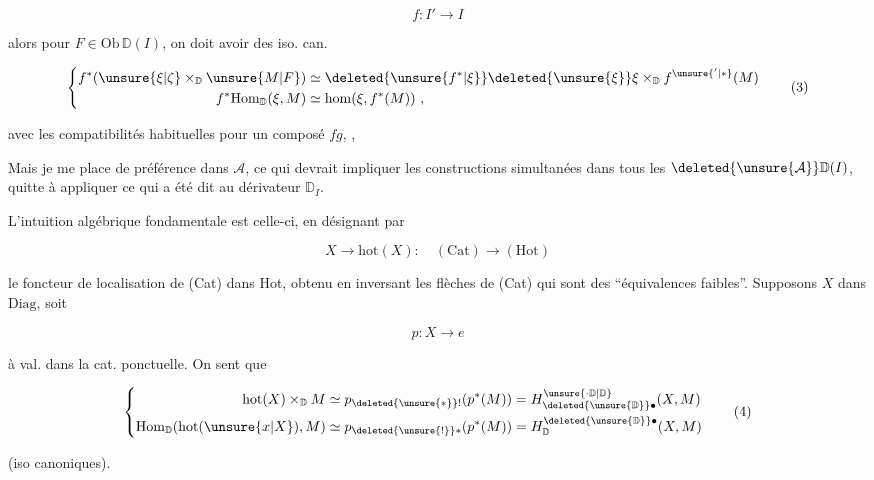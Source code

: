 

\[f:I'\longrightarrow I\]

alors pour $F\in\mathrm{Ob}\,\mathbb D(I)$, on doit avoir des iso. can.

\[
\left\{\begin{aligned}
f^{*}(\unsure{\xi|\zeta}\times_{\mathbb D}\unsure{M|F})&\simeq
\deleted{\unsure{f^{*}|\xi}}\deleted{\unsure{\xi}}\xi\times_{\mathbb D} f^{\unsure{'|*}}(M)\\
f^{*}\mathrm{Hom}_{\mathbb D}(\xi,M)&\simeq\mathrm{hom}(\xi,f^{*}(M))\ ,
\end{aligned}\right.\tag*{(3)}
\]

avec les compatibilités habituelles pour un composé $fg$, ,


Mais je me place de préférence dans $\mathcal A$, ce qui devrait impliquer les constructions simultanées dans tous les $\deleted{\unsure{\mathcal A}}\mathbb D(I)$, quitte à appliquer ce qui a été dit au dérivateur $\mathbb D_I$.

L'intuition algébrique fondamentale est celle-ci, en désignant par

\[X\longrightarrow\mathrm{hot}(X):\quad(\mathrm{Cat})\longrightarrow(\mathrm{Hot})\]

le foncteur de localisation de (Cat) dans Hot, obtenu en inversant les flèches de (Cat) qui sont des ``équivalences faibles''. Supposons $X$ dans $\mathrm{Diag}$, soit 

\[p:X\longrightarrow e\]

  à val. dans la cat. ponctuelle. On sent que

\[
\left\{\begin{aligned}
\mathrm{hot}(X)\times_{\mathbb D}M&\simeq p_{\deleted{\unsure{*}}!}(p^{*}(M))
=H^{\unsure{\cdot\mathbb D|\mathbb D}}_{\deleted{\unsure{\mathbb D}}\bullet}(X,M)\\
\mathrm{Hom}_{\mathbb D}(\mathrm{hot}(\unsure{x|X}),M)&\simeq p_{\deleted{\unsure{!}}*}(p^{*}(M))
=H_{\mathbb D}^{\deleted{\unsure{\mathbb D}}\bullet}(X,M)
\end{aligned}\right.\tag*{(4)}
\]

(iso canoniques).

